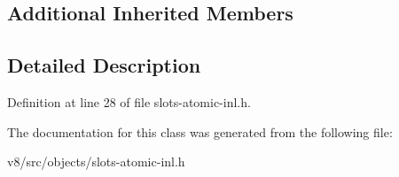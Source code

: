 \subsection*{Additional Inherited Members}


\subsection{Detailed Description}


Definition at line 28 of file slots-\/atomic-\/inl.\+h.



The documentation for this class was generated from the following file\+:\begin{DoxyCompactItemize}
\item 
v8/src/objects/slots-\/atomic-\/inl.\+h\end{DoxyCompactItemize}
